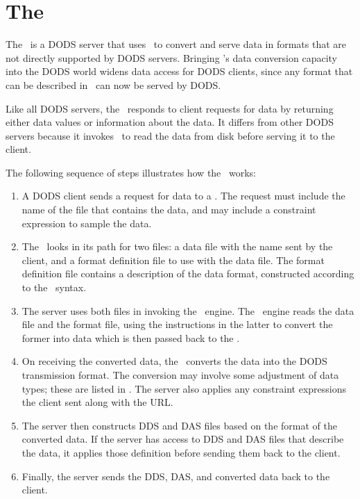 

%
%
%
%
%
%

\chapter{The \ffs}
\label{ff,ff-server}

The \ffs\ is a DODS server that uses \ffnd\ to convert and serve data
in formats that are not directly supported by DODS servers.  Bringing
\ffnd 's data conversion capacity into the DODS world widens data
access for DODS clients, since any format that can be described in
\ffnd\ can now be served by DODS.

Like all DODS servers, the \ffs\ responds to client requests for data
by returning either data values or information about the data.  It
differs from other DODS servers because it invokes \ffnd\ to read the
data from disk before serving it to the client.

The following sequence of steps illustrates how the \ffs\ works:

\begin{enumerate}
\item A DODS client sends a request for data to a \ffs .  The request
  must include the name of the file that contains the data, and may
  include a constraint expression to sample the data.
\item The \ffs\ looks in its path for two files: a data file with the
  name sent by the client, and a format definition file to use with
  the data file.  The format definition file contains a description of
  the data format, constructed according to the \ffnd\ syntax.
\item The server uses both files in invoking the \ffnd\ engine.  The
  \ffnd\ engine reads the data file and the format file, using the
  instructions in the latter to convert the former into data which is
  then passed back to the \ffs .
\item On receiving the converted data, the \ffs\ converts the data
  into the DODS transmission format.  The conversion may involve some
  adjustment of data types; these are listed in
  .  The server also applies any constraint
  expressions the client sent along with the URL.
\item The server then constructs DDS and DAS files based on the format
  of the converted data.  If the server has access to DDS and DAS
  files that describe the data, it applies those definition before
  sending them back to the client.
\item Finally, the server sends the DDS, DAS, and converted data back
  to the client.
\end{enumerate}

